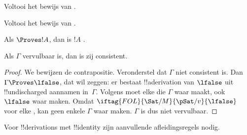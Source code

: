 \documentclass[openany]{memoir}
\begin{document}
\begin{prob}
Voltooi het bewijs van .
\end{prob}
\tagendprob

\begin{prob}
Voltooi het bewijs van .
\end{prob}
\tagendprob

\begin{cor}
Als $\Proves !A$, dan is $!A$ .
\end{cor}

\begin{cor}
Als $\Gamma$ vervulbaar is, dan is zij consistent.
\end{cor}

\begin{proof}
We bewijzen de contrapositie. Veronderstel dat $\Gamma$ niet
consistent is. Dan $\Gamma \Proves \lfalse$, dat wil zeggen: er bestaat
!!a{derivation} van $\lfalse$ uit !!{undischarged} aannamen
in~$\Gamma$. Volgens  moet elke
die $\Gamma$ waar maakt, ook $\lfalse$ waar maken. Omdat
$\iftag{FOL}{\Sat/{M}}{\pSat/{v}}{\lfalse}$ voor elke
,
kan geen enkele  $\Gamma$
waar maken. $\Gamma$ is dus niet vervulbaar.
\end{proof}
\endgroup

\begingroup
\def\olfilename{OLP-0096}
\def\olfilepath{content/first-order-logic/natural-deduction/}
\hypertarget{unit-OLP-0096}{}





Voor !!{derivation}s met !!{identity} zijn aanvullende
afleidingsregels nodig.
\end{document}
